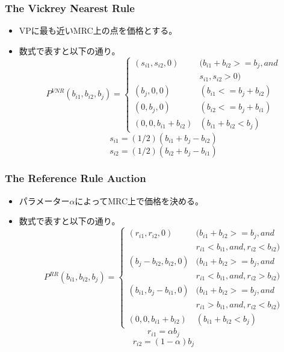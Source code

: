 \documentclass[dvipdfmx,12pt]{beamer}
\begin{document}
\begin{frame}
\frametitle{The Vickrey Nearest Rule}
\begin{itemize}\setlength{\parskip}{0.5em}
\item
VPに最も近いMRC上の点を価格とする。
\item
数式で表すと以下の通り。
\begin{equation}
  P^{VNR}(b_{i1}, b_{i2}, b_{j}) = \begin{cases}
    (s_{i1}, s_{i2}, 0) & (b_{i1} + b_{i2} >= b_{j},and \\ & s_{i1},s_{i2} > 0) \\
    (b_{j}, 0, 0) & (b_{i1} <= b_{j} + b_{i2})\\
    (0, b_{j}, 0) & (b_{i2} <= b_{j} + b_{i1})\\
    (0, 0, b_{i1} + b_{i2}) & (b_{i1} + b_{i2} < b_{j})
  \end{cases}
\end{equation}
\begin{equation}
s_{i1} = (1/2)(b_{i1} + b_{j} - b_{i2})
\end{equation}
\begin{equation}
s_{i2} = (1/2)(b_{i2} + b_{j} - b_{i1})
\end{equation}

\end{itemize}
\end{frame}

\begin{frame}
\frametitle{The Reference Rule Auction}
\begin{itemize}\setlength{\parskip}{0.5em}
\item
パラメーター$\alpha$によってMRC上で価格を決める。
\item
数式で表すと以下の通り。
\begin{equation}
  P^{RR}(b_{i1}, b_{i2}, b_{j}) = \begin{cases}
    (r_{i1}, r_{i2}, 0) & (b_{i1} + b_{i2} >= b_{j},and \\ & r_{i1} < b_{i1},and ,r_{i2} < b_{i2}) \\
    (b_{j} - b_{i2}, b_{i2}, 0) & (b_{i1} + b_{i2} >= b_{j},and \\ & r_{i1} < b_{i1},and,  r_{i2} > b_{i2})\\
    (b_{i1}, b_{j} - b_{i1}, 0) & (b_{i1} + b_{i2} >= b_{j},and \\ & r_{i1} > b_{i1},and,  r_{i2} < b_{i2})\\
    (0, 0, b_{i1} + b_{i2}) & (b_{i1} + b_{i2} < b_{j})
  \end{cases}
\end{equation}
\begin{equation}
r_{i1} = \alpha  b_{j}
\end{equation}
\begin{equation}
r_{i2} = (1-\alpha)  b_{j}
\end{equation}
\end{itemize}
\end{frame}
\end{document}

